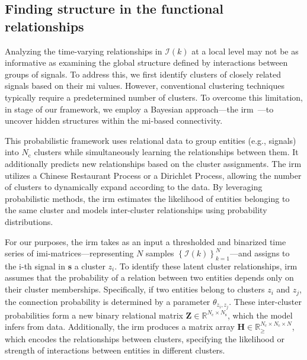 \subsection{Finding structure in the functional relationships}\label{sec:the_irm}
Analyzing the time-varying relationships in $\bm{\mathcal{I}}(k)$ at a local level may not be as informative as examining the global structure defined by interactions between groups of signals. To address this, we first identify clusters of closely related signals based on their \ac{mi} values. However, conventional clustering techniques typically require a predetermined number of clusters. To overcome this limitation, in stage  of our framework, we employ a Bayesian approach---the \ac{irm}~\cite{Moerup2012}---to uncover hidden structures within the \ac{mi}-based connectivity.

This probabilistic framework uses relational data to group entities (e.g., signals) into $N_\text{c}$ clusters while simultaneously learning the relationships between them. It additionally predicts new relationships based on the cluster assignments. The \ac{irm} utilizes a Chinese Restaurant Process or a Dirichlet Process, allowing the number of clusters to dynamically expand according to the data. By leveraging probabilistic methods, the \ac{irm} estimates the likelihood of entities belonging to the same cluster and models inter-cluster relationships using probability distributions.

For our purposes, the \ac{irm} takes as an input a thresholded and binarized time series of \ac{imi}-matrices---representing $N$ samples $\left\lbrace \bm{\mathcal{I}}(k)\right\rbrace^{N}_{k=1}$---and assigns to the i-th signal in $\bm{s}$ a cluster $z_i$. To identify these latent cluster relationships, \ac{irm} assumes that the probability of a relation between two entities depends only on their cluster memberships. Specifically, if two entities belong to clusters $z_i$ and $z_j$, the connection probability is determined by a parameter $\theta_{z_i,z_j}$. These inter-cluster probabilities form a new binary relational matrix $\bm{Z}\in \mathbb{R}^{N_\text{c}\times N_\text{s}}$, which the model infers from data. Additionally, the \ac{irm} produces a matrix array $\bm{H}\in \mathbb{R}^{N_\text{c}\times N_\text{c} \times N}_{\geq}$, which encodes the relationships between clusters, specifying the likelihood or strength of interactions between entities in different clusters.

